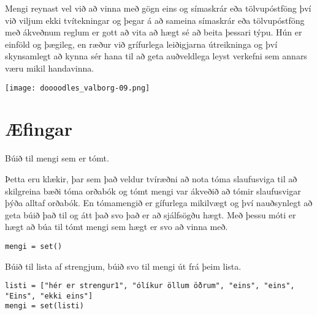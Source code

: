 Mengi reynast vel við að vinna með gögn eins og símaskrár eða tölvupóstföng því við viljum ekki tvítekningar og þegar á að sameina símaskrár eða tölvupóstföng með ákveðnum reglum er gott að vita að hægt sé að beita þessari týpu.
Hún er einföld og þægileg, en ræður við grífurlega leiðigjarna útreikninga og því skynsamlegt að kynna sér hana til að geta auðveldlega leyst verkefni sem annars væru mikil handavinna.

	\begin{center}
		\texttt{[image: doooodles\_valborg-09.png]}
	\end{center}

\newpage
\section{Æfingar}
\begin{exercise}\label{set1}
Búið til mengi sem er tómt.
\end{exercise}
\begin{Answer}[ref={set1}]
Þetta eru klækir, þar sem það veldur tvíræðni að nota tóma slaufusviga til að skilgreina bæði tóma orðabók og tómt mengi var ákveðið að tómir slaufusvigar þýða alltaf orðabók.
En tómamengið er gífurlega mikilvægt og því nauðsynlegt að geta búið það til og átt það svo það er að sjálfsögðu hægt.
Með þessu móti er hægt að búa til tómt mengi sem hægt er svo að vinna með.
	\begin{lstlisting}
mengi = set()
	\end{lstlisting}
\end{Answer}


\begin{exercise}\label{set2}
Búið til lista af strengjum, búið svo til mengi út frá þeim lista.
\end{exercise}
\begin{Answer}[ref={set2}]
	
	\begin{lstlisting}
listi = ["hér er strengur1", "ólíkur öllum öðrum", "eins", "eins", "Eins", "ekki eins"]
mengi = set(listi)\end{lstlisting}
\end{Answer}


